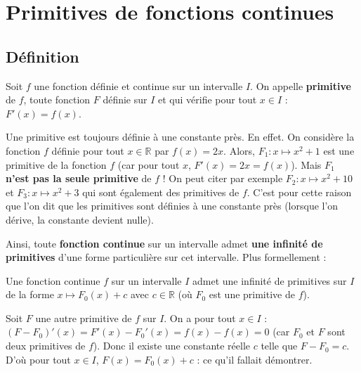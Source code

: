 



	\section{Primitives de fonctions continues}
	
	\subsection{Définition}
	
	\begin{formula}[Définition]
		Soit $f$ une fonction définie et continue sur un intervalle $I$. On appelle \textbf{primitive} de $f$, toute fonction $F$ définie sur $I$ et qui vérifie pour tout $x \in I$ : $F'(x) = f(x)$.
	\end{formula}
	
	\begin{tip}[Note]
		Une primitive est toujours définie à une constante près.
		\newpar
		En effet. On considère la fonction $f$ définie pour tout $x \in \mathbb{R}$ par $f(x) = 2x$. Alors, $F_{1} : x \mapsto x^2 + 1$ est une primitive de la fonction $f$ (car pour tout $x$, $F'(x) = 2x = f(x)$).
		\newpar
		Mais $F_{1}$ \textbf{n'est pas la seule primitive} de $f$ ! On peut citer par exemple $F_{2} : x \mapsto x^2 + 10$ et $F_{3} : x \mapsto x^2 + 3$ qui sont également des primitives de $f$.
		\newpar
		C'est pour cette raison que l'on dit que les primitives sont définies à une constante près (lorsque l'on dérive, la constante devient nulle).
	\end{tip}
	
	Ainsi, toute \textbf{fonction continue} sur un intervalle admet \textbf{une infinité de primitives} d'une forme particulière sur cet intervalle. Plus formellement :
	
	\begin{formula}
		Une fonction continue $f$ sur un intervalle $I$ admet une infinité de primitives sur $I$ de la forme $x \mapsto F_0(x) + c$ avec $c \in \mathbb{R}$ (où $F_0$ est une primitive de $f$).
	\end{formula}
	
	\begin{demonstration}
		Soit $F$ une autre primitive de $f$ sur $I$. On a pour tout $x \in I$ :
		\newpar
		$(F - F_0)'(x) = F'(x) - F_0'(x) = f(x) - f(x) = 0$ (car $F_0$ et $F$ sont deux primitives de $f$).
		\newpar
		Donc il existe une constante réelle $c$ telle que $F - F_0 = c$. D'où pour tout $x \in I$, $F(x) = F_0(x) + c$ : ce qu'il fallait démontrer.
	\end{demonstration}
	
